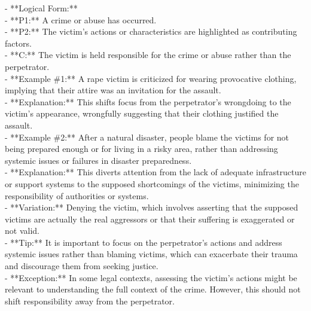 \documentclass[a4paper,12pt,single,pdftex]{scrartcl}
\begin{document}
    
      - **Logical Form:**
    \\

    
        - **P1:** A crime or abuse has occurred.
    \\

    
        - **P2:** The victim's actions or characteristics are highlighted as contributing factors.
    \\

    
        - **C:** The victim is held responsible for the crime or abuse rather than the perpetrator.
    \\

    
      - **Example \#1:** A rape victim is criticized for wearing provocative clothing, implying that their attire was an invitation for the assault.
    \\

    
      - **Explanation:** This shifts focus from the perpetrator's wrongdoing to the victim's appearance, wrongfully suggesting that their clothing justified the assault.
    \\

    
      - **Example \#2:** After a natural disaster, people blame the victims for not being prepared enough or for living in a risky area, rather than addressing systemic issues or failures in disaster preparedness.
    \\

    
      - **Explanation:** This diverts attention from the lack of adequate infrastructure or support systems to the supposed shortcomings of the victims, minimizing the responsibility of authorities or systems.
    \\

    
      - **Variation:** Denying the victim, which involves asserting that the supposed victims are actually the real aggressors or that their suffering is exaggerated or not valid.
    \\

    
      - **Tip:** It is important to focus on the perpetrator’s actions and address systemic issues rather than blaming victims, which can exacerbate their trauma and discourage them from seeking justice.
    \\

    
      - **Exception:** In some legal contexts, assessing the victim's actions might be relevant to understanding the full context of the crime. However, this should not shift responsibility away from the perpetrator.
    \\
\end{document}
